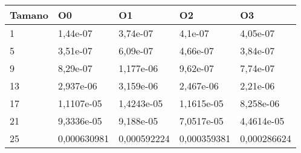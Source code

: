 \begin{tabular}{|l|l|l|l|l|}
	\hline
	Tamano & O0 & O1 & O2 & O3 \\
	\hline
	\hline
	1 & 1,44e-07 & 3,74e-07 & 4,1e-07 & 4,05e-07 \\
	\hline
	5 & 3,51e-07 & 6,09e-07 & 4,66e-07 & 3,84e-07 \\
	\hline
	9 & 8,29e-07 & 1,177e-06 & 9,62e-07 & 7,74e-07 \\
	\hline
	13 & 2,937e-06 & 3,159e-06 & 2,467e-06 & 2,21e-06 \\
	\hline
	17 & 1,1107e-05 & 1,4243e-05 & 1,1615e-05 & 8,258e-06 \\
	\hline
	21 & 9,3336e-05 & 9,188e-05 & 7,0517e-05 & 4,4614e-05 \\
	\hline
	25 & 0,000630981 & 0,000592224 & 0,000359381 & 0,000286624 \\
	\hline
\end{tabular}
